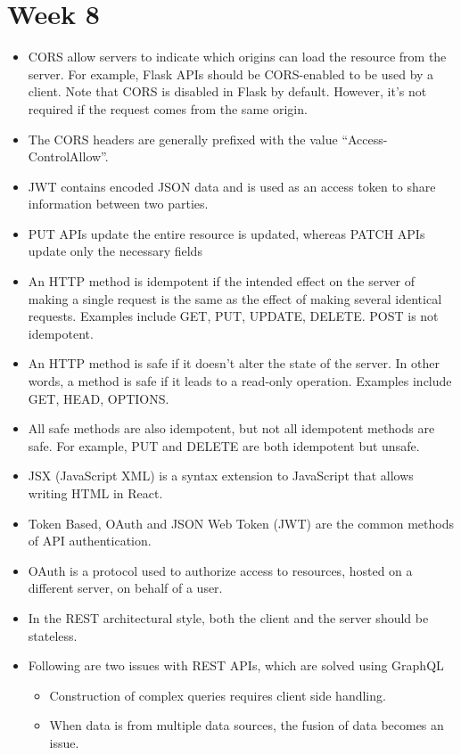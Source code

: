 \documentclass[a4paper]{article}
\begin{document}
\section{Week 8}
\begin{itemize}
    \item CORS allow servers to indicate which origins can load the resource from the server. For example, Flask APIs should be CORS-enabled to be used by a client. Note that CORS is disabled in Flask by default. However, it’s not required if the request comes from the same origin.
    \item The CORS headers are generally prefixed with the value “Access-ControlAllow”.
    \item JWT contains encoded JSON data and is used as an access token to share information between two parties.
    \item PUT APIs update the entire resource is updated, whereas PATCH APIs update only the necessary fields
    \item An HTTP method is idempotent if the intended effect on the server of making a single request is the same as the effect of making several identical requests. Examples include GET, PUT, UPDATE, DELETE. POST is not idempotent.
    \item An HTTP method is  safe if it doesn't alter the state of the server. In other words, a method is safe if it leads to a read-only operation. Examples include GET, HEAD, OPTIONS.
    \item All safe methods are also idempotent, but not all idempotent  methods are safe. For example, PUT and DELETE are both idempotent but unsafe.
    \item JSX (JavaScript XML) is a syntax extension to JavaScript that allows writing HTML in React.
    \item Token Based, OAuth and JSON Web Token (JWT) are the common methods of API authentication.
    \item OAuth is a protocol used to authorize access to resources, hosted on a different server, on behalf of a user.
    \item In the REST architectural style, both the client and the server should be stateless.
    \item Following are two issues with REST APIs, which are solved using GraphQL
    \begin{itemize}
        \item Construction of complex queries requires client side handling.
        \item When data is from multiple data sources, the fusion of data becomes an issue.

\end{itemize}
\end{itemize}
\end{document}
